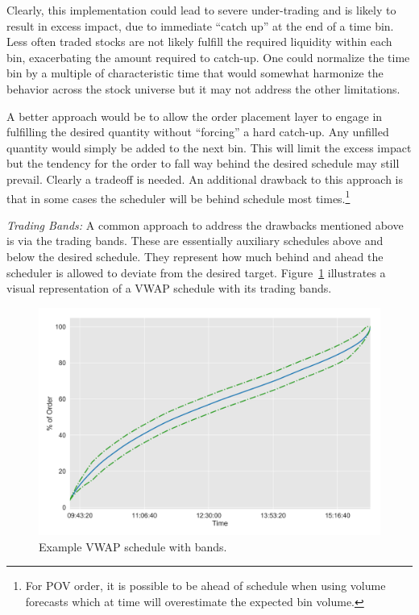 Clearly, this implementation could lead to severe under-trading and is likely to result in excess impact, due to immediate ``catch up'' at the end of a time bin. Less often traded stocks are not likely fulfill the required liquidity within each bin, exacerbating the amount required to catch-up. One could normalize the time bin by a multiple of characteristic time that would somewhat harmonize the behavior across the stock universe but it may not address the other limitations.


A better approach would be to allow the order placement layer to engage in fulfilling the desired quantity without ``forcing'' a hard catch-up. Any unfilled quantity would simply be added to the next bin. This will limit the excess impact but the tendency for the order to fall way behind the desired schedule may still prevail. Clearly a tradeoff is needed. An additional drawback to this approach is that in some cases the scheduler will be behind schedule most times.\footnote{For POV order, it is possible to be ahead of schedule when using volume forecasts which at time will overestimate the expected bin volume.} \twomedskip


\noindent\emph{Trading Bands:} A common approach to address the drawbacks mentioned above is via the trading bands. These are essentially auxiliary schedules above and below the desired schedule. They represent how much behind and ahead the scheduler is allowed to deviate from the desired target. Figure~\ref{fig:schedule} illustrates a visual representation of a VWAP schedule with its trading bands. 

	\begin{figure}[!ht]
	\centering
	\includegraphics[width=\textwidth]{chapters/chapter_exec_models/figures/schedule.png} 
	\caption{Example VWAP schedule with bands. \label{fig:schedule}}
	\end{figure}


